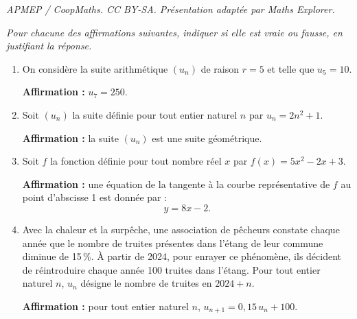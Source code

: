 \documentclass[10pt]{article}
\begin{document}
\noindent\textit{APMEP / CoopMaths. CC BY-SA. Présentation adaptée par Maths Explorer.}\par\medskip
\emph{Pour chacune des affirmations suivantes, indiquer si elle est vraie ou fausse, en justifiant la réponse.}

\begin{enumerate}
	\item On considère la suite arithmétique $\left(u_n\right)$ de raison $r=5$ et telle que $u_5=10$.

	\textbf{Affirmation :} $u_7 = 250$.

	\item Soit $\left(u_n\right)$ la suite définie pour tout entier naturel $n$ par $u_n = 2n^2+1$.

	\textbf{Affirmation :} la suite $\left(u_n\right)$ est une suite géométrique.

	\item Soit $f$ la fonction définie pour tout nombre réel $x$ par $f(x) = 5x^2-2x+3$.

	\textbf{Affirmation :} une équation de la tangente à la courbe représentative de $f$ au point d'abscisse 1 est donnée par :
	\[y = 8x-2.\]

	\item Avec la chaleur et la surpêche, une association de pêcheurs constate chaque année que le nombre de truites présentes dans l'étang de leur commune diminue de 15\,\%. À partir de 2024, pour enrayer ce phénomène, ils décident de réintroduire chaque année 100 truites dans l'étang. Pour tout entier naturel $n$, $u_n$ désigne le nombre de truites en $2024+n$.

	\textbf{Affirmation :} pour tout entier naturel $n$, $u_{n+1} = 0,15\,u_n + 100$.
\end{enumerate}
\end{document}

